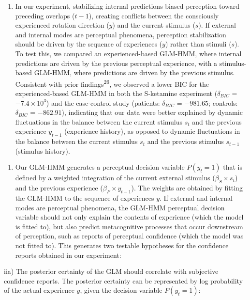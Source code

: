 \documentclass[
]{article}
\providecommand{\tightlist}{%
  \setlength{\itemsep}{0pt}\setlength{\parskip}{0pt}}
\begin{document}
\begin{enumerate}
\def\labelenumi{(\roman{enumi})}
\tightlist
\item
  In our experiment, stabilizing internal predictions biased perception
  toward preceding overlaps (\(t-1\)), creating conflicts between the
  consciously experienced rotation direction (\(y\)) and the current
  stimulus (\(s\)). If external and internal modes are perceptual
  phenomena, perception stabilization should be driven by the sequence
  of experiences (\(y\)) rather than stimuli (\(s\)). To test this, we
  compared an experienced-based GLM-HMM, where internal predictions are
  driven by the previous perceptual experience, with a stimulus-based
  GLM-HMM, where predictions are driven by the previous stimulus.
  Consistent with prior findings\textsuperscript{26}, we observed a
  lower BIC for the experienced-based GLM-HMM in both the S-ketamine
  experiment (\(\delta_{BIC}\) = \(\ensuremath{-7.4\times 10^{3}}\)) and
  the case-control study (patients: \(\delta_{BIC}\) = \(-981.65\);
  controls: \(\delta_{BIC}\) = \(-862.91\)), indicating that our data
  were better explained by dynamic fluctuations in the balance between
  the current stimulus \(s_t\) and the previous experience \(y_{t-1}\)
  (experience history), as opposed to dynamic fluctuations in the
  balance between the current stimulus \(s_t\) and the previous stimulus
  \(s_{t-1}\) (stimulus history).
\end{enumerate}

\begin{enumerate}
\def\labelenumi{\roman{enumi})}
\setcounter{enumi}{1}
\tightlist
\item
  Our GLM-HMM generates a perceptual decision variable \(P(y_t = 1)\)
  that is defined by a weighted integration of the current external
  stimulus (\(\beta_S \times s_t\)) and the previous experience
  (\(\beta_P \times y_{t-1}\)). The weights are obtained by fitting the
  GLM-HMM to the sequence of experiences \(y\). If external and internal
  modes are perceptual phenomena, the GLM-HMM perceptual decision
  variable should not only explain the contents of experience (which the
  model is fitted to), but also predict metacognitive processes that
  occur downstream of perception, such as reports of perceptual
  confidence (which the model was not fitted to). This generates two
  testable hypotheses for the confidence reports obtained in our
  experiment:
\end{enumerate}

iia) The posterior certainty of the GLM should correlate with subjective
confidence reports. The posterior certainty can be represented by log
probability of the actual experience \(y\), given the decision variable
\(P(y_t = 1)\):
\end{document}
